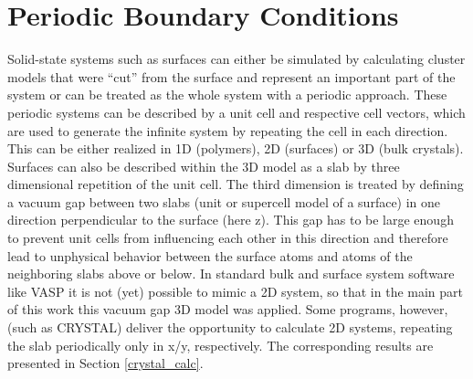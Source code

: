 \documentclass[11pt,DIV=13,BCOR=5mm,a4paper,headinclude]{scrbook}
\begin{document}
\section{Periodic Boundary Conditions}
Solid-state systems such as surfaces can either be simulated by calculating cluster models that were ``cut'' from the surface and represent an important part of the system or can be treated as the whole system with a periodic approach.
These periodic systems can be described by a unit cell and respective cell vectors, which are used to generate the infinite system by repeating the cell in each direction.
This can be either realized in 1D (polymers), 2D (surfaces) or 3D (bulk crystals).
Surfaces can also be described within the 3D model as a slab by three dimensional repetition of the unit cell.
The third dimension is treated by defining a vacuum gap between two slabs (unit or supercell model of a surface) in one direction perpendicular to the surface (here z).
This gap has to be large enough to prevent unit cells from influencing each other in this direction and therefore lead to unphysical behavior between the surface atoms and atoms of the neighboring slabs above or below.
In standard bulk and surface system software like VASP\cite{kresse1993,kresse2,kresse3,kresse4,kresse99} it is not (yet) possible to mimic a 2D system, so that in the main part of this work this vacuum gap 3D model was applied.
Some programs, however, (such as CRYSTAL\cite{crystal14}) %
deliver the opportunity to calculate 2D systems, repeating the slab periodically only in x/y, respectively.
The corresponding results are presented in Section \ref{crystal_calc}.


\end{document}
